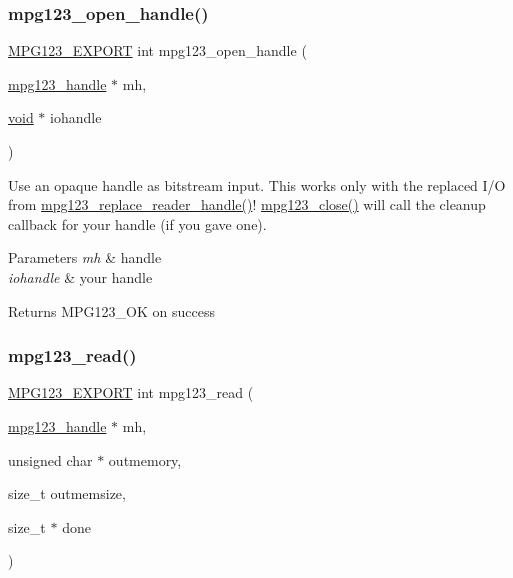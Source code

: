 \subsubsection{\texorpdfstring{mpg123\_open\_handle()}{mpg123\_open\_handle()}}
{\footnotesize\ttfamily \mbox{\hyperlink{mpg123_8h_a2ba98cfba3f760879df70e755b2a61cc}{M\+P\+G123\+\_\+\+E\+X\+P\+O\+RT}} int mpg123\+\_\+open\+\_\+handle (\begin{DoxyParamCaption}\item[{\mbox{\hyperlink{group__mpg123__init_ga6728e2839a395f3a07d4514da659faca}{mpg123\+\_\+handle}} $\ast$}]{mh,  }\item[{\mbox{\hyperlink{_s_d_l__opengles2__gl2ext_8h_ae5d8fa23ad07c48bb609509eae494c95}{void}} $\ast$}]{iohandle }\end{DoxyParamCaption})}

Use an opaque handle as bitstream input. This works only with the replaced I/O from \mbox{\hyperlink{group__mpg123__lowio_ga61a125c56f2aab9590a4b1a29194dc10}{mpg123\+\_\+replace\+\_\+reader\+\_\+handle()}}! \mbox{\hyperlink{group__mpg123__input_ga156eb0774196db868485662dc31621af}{mpg123\+\_\+close()}} will call the cleanup callback for your handle (if you gave one). 
\begin{DoxyParams}{Parameters}
{\em mh} & handle \\
\hline
{\em iohandle} & your handle \\
\hline
\end{DoxyParams}
\begin{DoxyReturn}{Returns}
M\+P\+G123\+\_\+\+OK on success 
\end{DoxyReturn}
\mbox{\label{group__mpg123__input_ga8023e3b24e8a70d9589c6c7567c54a41}} 
\subsubsection{\texorpdfstring{mpg123\_read()}{mpg123\_read()}}
{\footnotesize\ttfamily \mbox{\hyperlink{mpg123_8h_a2ba98cfba3f760879df70e755b2a61cc}{M\+P\+G123\+\_\+\+E\+X\+P\+O\+RT}} int mpg123\+\_\+read (\begin{DoxyParamCaption}\item[{\mbox{\hyperlink{group__mpg123__init_ga6728e2839a395f3a07d4514da659faca}{mpg123\+\_\+handle}} $\ast$}]{mh,  }\item[{unsigned char $\ast$}]{outmemory,  }\item[{size\+\_\+t}]{outmemsize,  }\item[{size\+\_\+t $\ast$}]{done }\end{DoxyParamCaption})}

